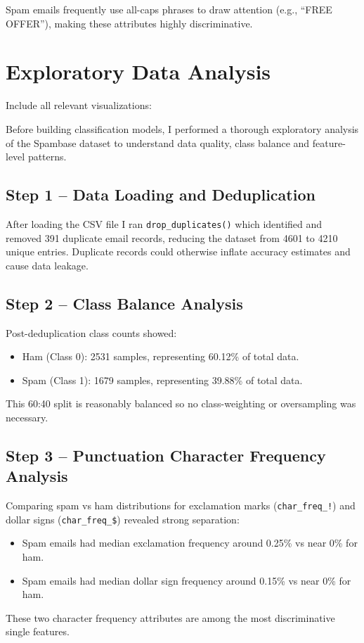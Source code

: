 \documentclass[12pt,a4paper]{article}
\begin{document}
Spam emails frequently use all-caps phrases to draw attention (e.g., ``FREE OFFER''), making these attributes highly discriminative.

\section{Exploratory Data Analysis}

Include all relevant visualizations:

Before building classification models, I performed a thorough exploratory analysis of the Spambase dataset to understand data quality, class balance and feature-level patterns.

\subsection*{Step 1 -- Data Loading and Deduplication}
After loading the CSV file I ran \texttt{drop\_duplicates()} which identified and removed 391 duplicate email records, reducing the dataset from 4601 to 4210 unique entries. Duplicate records could otherwise inflate accuracy estimates and cause data leakage.

\subsection*{Step 2 -- Class Balance Analysis}
Post-deduplication class counts showed:
\begin{itemize}
\item Ham (Class 0): 2531 samples, representing 60.12\% of total data.
\item Spam (Class 1): 1679 samples, representing 39.88\% of total data.
\end{itemize}
This 60:40 split is reasonably balanced so no class-weighting or oversampling was necessary.

\subsection*{Step 3 -- Punctuation Character Frequency Analysis}
Comparing spam vs ham distributions for exclamation marks (\texttt{char\_freq\_!}) and dollar signs (\texttt{char\_freq\_\$}) revealed strong separation:
\begin{itemize}
\item Spam emails had median exclamation frequency around 0.25\% vs near 0\% for ham.
\item Spam emails had median dollar sign frequency around 0.15\% vs near 0\% for ham.
\end{itemize}
These two character frequency attributes are among the most discriminative single features.
\end{document}
